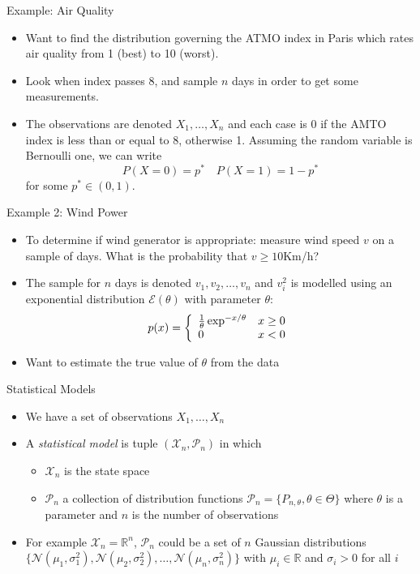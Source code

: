\documentclass{beamer}
\begin{document}
\begin{frame}{Example: Air Quality} 
\begin{itemize}
 \item Want to find the distribution governing the ATMO index in Paris which rates air quality from 1 (best) to 10 (worst). 
 \item Look when index passes 8, and sample $n$ days in order to get some measurements. 
 \item The observations are denoted $X_1, \ldots, X_n$ and each case is 0 if the AMTO index is less than or equal to 8, otherwise 1. Assuming the random variable is Bernoulli one, we can write 
\begin{displaymath}
P(X = 0) = p^* \quad P(X = 1) = 1- p^*  
\end{displaymath}
for some $p^* \in (0, 1)$. 
\end{itemize}
\end{frame}

\begin{frame}{Example 2: Wind Power} 
\begin{itemize} 
 \item To determine if wind generator is appropriate: measure wind speed $v$ on a sample of days. What is the probability that $v \geq 10$Km/h?
 \item The sample for $n$ days is denoted $v_1, v_2, \ldots, v_n$ and $v_i^2$ is modelled using an exponential distribution $\mathcal{E}(\theta)$ with parameter $\theta$: 
  \begin{displaymath}
  p(x) = \left\{ \begin{array}{l l}\frac{1}{\theta}  \exp^{-x/\theta} & x \geq 0 \\ 0 & x < 0 \end{array} \right. 
 \end{displaymath}
 \item Want to estimate the true value of $\theta$ from the data 
\end{itemize}
\end{frame}


\begin{frame}{Statistical Models} 
\begin{itemize} 
 \item We have a set of observations $X_1, \ldots, X_n$
 \item A \emph{statistical model} is tuple $(\mathcal{X}_n, \mathcal{P}_n)$ in which 
 \begin{itemize} 
 \item $\mathcal{X}_n$ is the state space 
  \item $\mathcal{P}_n$ a collection of distribution functions $\mathcal{P}_n = \{P_{n, \theta}, \theta \in \Theta\}$ where $\theta$ is a parameter and $n$ is the number of observations 
 \end{itemize}
  \item For example $\mathcal{X}_n = \mathbb{R}^n$, $\mathcal{P}_n$ could be a set of $n$ Gaussian distributions $\{\mathcal{N}(\mu_1, \sigma^2_1), \mathcal{N}(\mu_2, \sigma^2_2), \ldots, \mathcal{N}(\mu_n, \sigma^2_n)\}$ with $\mu_i \in \mathbb{R}$ and $\sigma_i > 0$ for all $i$ 
\end{itemize}
\end{frame}
\end{document}
